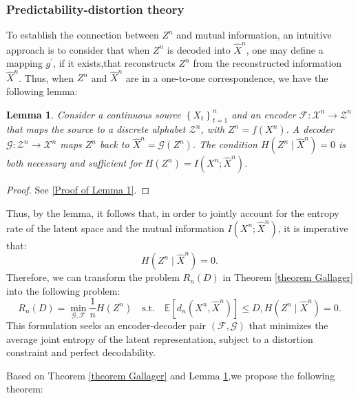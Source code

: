 \documentclass[12pt,review,authoryear]{elsarticle}
\theoremstyle{upright}
\newtheorem{lemma}{Lemma}
\begin{document}
\subsubsection{Predictability-distortion theory}
To establish the connection between $Z^n$ and mutual information, an intuitive approach is to consider that when $Z^n$ is decoded into $\hat{X}^n$, one may define a mapping $g^{\prime}$, if it exists,that reconstructs $Z^n$ from the reconstructed information $\hat{X}^n$. Thus, when $Z^n$ and $\hat{X}^n$ are in a one-to-one correspondence, we have the following lemma:
\newline
\begin{lemma}\label{thm:mutual_information_equality}
Consider a continuous source $\left\{X_t\right\}_{t=1}^n$ and an encoder $\mathcal{F}: \mathcal{X}^n \rightarrow \mathcal{Z}^n$ that maps the source to a discrete alphabet $\mathcal{Z}^n$, with $Z^n = f\left(X^n\right)$. A decoder $\mathcal{G}: \mathcal{Z}^n \rightarrow \mathcal{X}^n$ maps $Z^n$ back to $\hat{X}^n = \mathcal{G}\left(Z^n\right)$. The condition $H\left(Z^n \mid \hat{X}^n\right) = 0$ is both necessary and sufficient for $H\left( Z^n\right) = I\left(X^n; \hat{X}^n\right)$.

\end{lemma}


\begin{proof}
See \ref{Proof of Lemma 1}.
\end{proof}
Thus, by the lemma, it follows that, in order to jointly account for the entropy rate of the latent space and the mutual information $I\left(X^n ; \hat{X}^n\right)$, it is imperative that:
\[
H\left(Z^n \mid \hat{X}^n\right) = 0.
\]
Therefore, we can transform the problem $R_n(D)$ in Theorem \ref{theorem Gallager} into the following problem:
$$
R_n(D)=\min _{\mathcal{G}, \mathcal{F}} \frac{1}{n} H\left(Z^n\right) \quad \text{s.t.} \quad \mathbb{E}\left[d_n\left(X^n, \hat{X}^n\right)\right] \leq D, H\left(Z^n \mid \hat{X}^n\right)=0.
$$
This formulation seeks an encoder-decoder pair \((\mathcal{F}, \mathcal{G})\) that minimizes the average joint entropy of the latent representation, subject to a distortion constraint and perfect decodability. 

Based on Theorem \ref{theorem Gallager} and Lemma \ref{thm:mutual_information_equality},we propose the following theorem:
\end{document}
